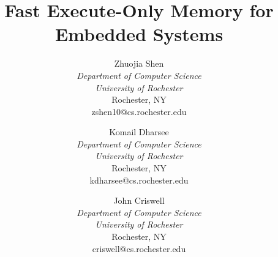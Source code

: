 \documentclass[conference]{IEEEtran}
\begin{document}
\title{Fast Execute-Only Memory for Embedded Systems}

\author{
  Zhuojia Shen \\
  {\it Department of Computer Science} \\
  {\it University of Rochester} \\
  Rochester, NY \\
  zshen10@cs.rochester.edu
  \and
  Komail Dharsee \\
  {\it Department of Computer Science} \\
  {\it University of Rochester} \\
  Rochester, NY \\
  kdharsee@cs.rochester.edu
  \and
  John Criswell \\
  {\it Department of Computer Science} \\
  {\it University of Rochester} \\
  Rochester, NY \\
  criswell@cs.rochester.edu
}

\maketitle















\end{document}
